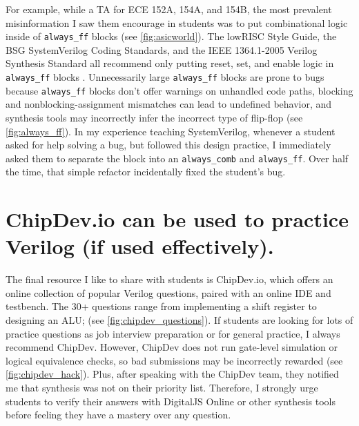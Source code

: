 


For example, while a TA for ECE 152A, 154A, and 154B, the most prevalent misinformation I saw them encourage in students was to put combinational logic inside of \texttt{always_ff} blocks (see \autoref{fig:asicworld}). The lowRISC Style Guide, the BSG SystemVerilog Coding Standards, and the IEEE 1364.1-2005 Verilog Synthesis Standard all recommend only putting reset, set, and enable logic in \texttt{always_ff} blocks \cite{lowRISCstyleguides, BSGstyleguide, 1364.1-2005}. Unnecessarily large \texttt{always_ff} blocks are prone to bugs because \texttt{always_ff} blocks don't offer warnings on unhandled code paths, blocking and nonblocking-assignment mismatches can lead to undefined behavior, and synthesis tools may incorrectly infer the incorrect type of flip-flop (see \autoref{fig:always_ff}). In my experience teaching SystemVerilog, whenever a student asked for help solving a bug, but followed this design practice, I immediately asked them to separate the block into an \texttt{always_comb} and \texttt{always_ff}. Over half the time, that simple refactor incidentally fixed the student's bug.

\FloatBarrier

\section{ChipDev.io can be used to practice Verilog (if used effectively).}




The final resource I like to share with students is ChipDev.io, which offers an online collection of popular Verilog questions, paired with an online IDE and testbench. The 30+ questions range from implementing a shift register to designing an ALU; (see \autoref{fig:chipdev_questions}). If students are looking for lots of practice questions as job interview preparation or for general practice, I always recommend ChipDev. However, ChipDev does not run gate-level simulation or logical equivalence checks, so bad submissions may be incorrectly rewarded (see \autoref{fig:chipdev_hack}). Plus, after speaking with the ChipDev team, they notified me that synthesis was not on their priority list. Therefore, I strongly urge students to verify their answers with DigitalJS Online or other synthesis tools before feeling they have a mastery over any question.
